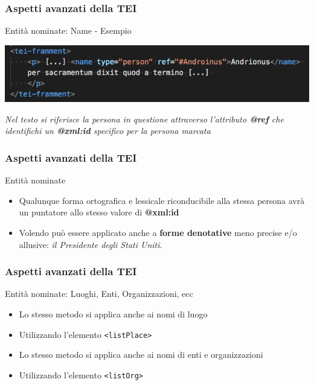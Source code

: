     \begin{frame}
        \frametitle{Aspetti avanzati della TEI}
        \addtocounter{nframe}{1}

        \begin{block}{Entità nominate: Name - Esempio}
            \begin{center}
                \includegraphics[width=.98\textwidth]{imgs/name.png}
            \end{center}
        \end{block}
        \textit{Nel testo si riferisce la persona in questione attraverso l'attributo \textbf{@ref} che identifichi un \textbf{@xml:id} specifico per la persona marcata}
    \end{frame}

    \begin{frame}
        \frametitle{Aspetti avanzati della TEI}
        \addtocounter{nframe}{1}

        \begin{block}{Entità nominate}
            \begin{itemize}
                \item Qualunque forma ortografica e lessicale riconducibile alla stessa persona avrà un puntatore allo stesso valore di \textbf{@xml:id}
                \item Volendo può essere applicato anche a \textbf{forme denotative} meno precise e/o allusive: \textit{il Presidente degli Stati Uniti}.
            \end{itemize}
        \end{block}
    \end{frame}

    \begin{frame}
        \frametitle{Aspetti avanzati della TEI}
        \addtocounter{nframe}{1}

        \begin{block}{Entità nominate: Luoghi, Enti, Organizzazioni, ecc}
            \begin{itemize}
                \item Lo stesso metodo si applica anche ai nomi di luogo
                \item [] Utilizzando l'elemento \texttt{<listPlace>}
                \item Lo stesso metodo si applica anche ai nomi di enti e organizzazioni
                \item [] Utilizzando l'elemento \texttt{<listOrg>}
            \end{itemize}
        \end{block}
    \end{frame}


